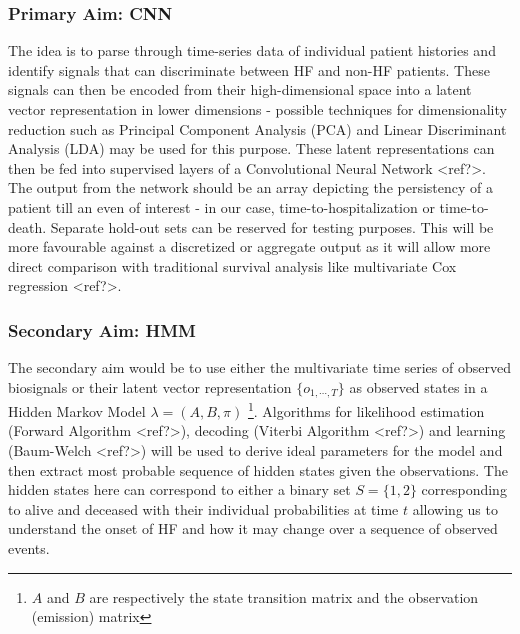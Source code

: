 \documentclass[%
 reprint,
 amsmath,amssymb,
 aps,
 nofootinbib
]{revtex4-2}
\theoremstyle{definition}
\begin{document}
\subsubsection{\label{prim}Primary Aim: CNN}
The idea is to parse through time-series data of individual patient histories and identify signals that can discriminate between HF and non-HF patients. These signals can then be encoded from their high-dimensional space into a latent vector representation in lower dimensions - possible techniques for dimensionality reduction such as Principal Component Analysis (PCA) and Linear Discriminant Analysis (LDA) may be used for this purpose. These latent representations can then be fed into supervised layers of a Convolutional Neural Network <ref?>. The output from the network should be an array depicting the persistency of a patient till an even of interest - in our case, time-to-hospitalization or time-to-death. 
Separate hold-out sets can be reserved for testing purposes. This will be more favourable against a discretized or aggregate output as it will allow more direct comparison with traditional survival analysis like multivariate Cox regression <ref?>.
\subsubsection{\label{sec}Secondary Aim: HMM}
The secondary aim would be to use either the multivariate time series of observed biosignals or their latent vector representation $\{o_{1,\cdots,T}\}$ as observed states in a Hidden Markov Model $\lambda = (A,B,\pi)$ \footnote{$A$ and $B$ are respectively the state transition matrix and the observation (emission) matrix}. Algorithms for likelihood estimation (Forward Algorithm <ref?>), decoding (Viterbi Algorithm <ref?>) and learning (Baum-Welch <ref?>) will be used to derive ideal parameters for the model and then extract most probable sequence of hidden states given the observations. The hidden states here can correspond to either a binary set $S = \{1 , 2\}$ corresponding to alive and deceased with their individual probabilities at time $t$ allowing us to understand the onset of HF and how it may change over a sequence of observed events.
\end{document}
